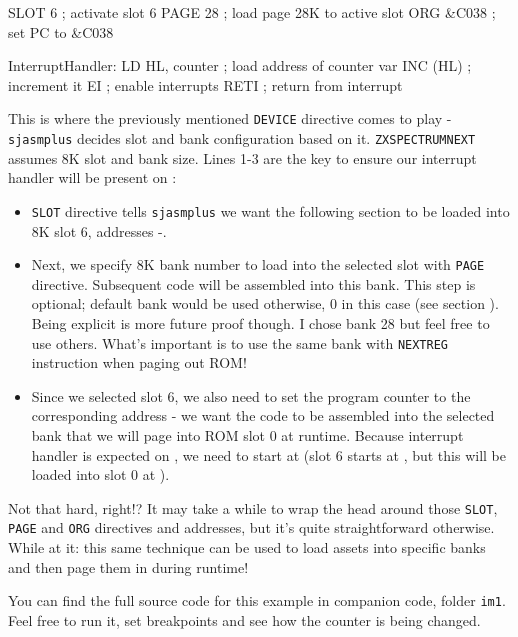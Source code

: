 \begin{tcblisting}{}
    SLOT 6             ; activate slot 6
    PAGE 28            ; load page 28K to active slot
    ORG &C038          ; set PC to &C038

InterruptHandler:
    LD HL, counter     ; load address of counter var
    INC (HL)           ; increment it
    EI                 ; enable interrupts
    RETI               ; return from interrupt
\end{tcblisting}

This is where the previously mentioned {\tt DEVICE} directive comes to play - {\tt sjasmplus} decides slot and bank configuration based on it. {\tt ZXSPECTRUMNEXT} assumes 8K slot and bank size. Lines 1-3 are the key to ensure our interrupt handler will be present on :

\begin{itemize}
	\item {\tt SLOT} directive tells {\tt sjasmplus} we want the following section to be loaded into 8K slot 6, addresses -.
	
	\item Next, we specify 8K bank number to load into the selected slot with {\tt PAGE} directive. Subsequent code will be assembled into this bank. This step is optional; default bank would be used otherwise, 0 in this case (see section ). Being explicit is more future proof though. I chose bank 28 but feel free to use others. What's important is to use the same bank with {\tt NEXTREG} instruction when paging out ROM!
	
	\item Since we selected slot 6, we also need to set the program counter to the corresponding address - we want the code to be assembled into the selected bank that we will page into ROM slot 0 at runtime. Because interrupt handler is expected on , we need to start at  (slot 6 starts at , but this will be loaded into slot 0 at ).
\end{itemize}

Not that hard, right!? It may take a while to wrap the head around those {\tt SLOT}, {\tt PAGE} and {\tt ORG} directives and addresses, but it's quite straightforward otherwise. While at it: this same technique can be used to load assets into specific banks and then page them in during runtime!

You can find the full source code for this example in companion code, folder {\tt im1}. Feel free to run it, set breakpoints and see how the counter is being changed.

